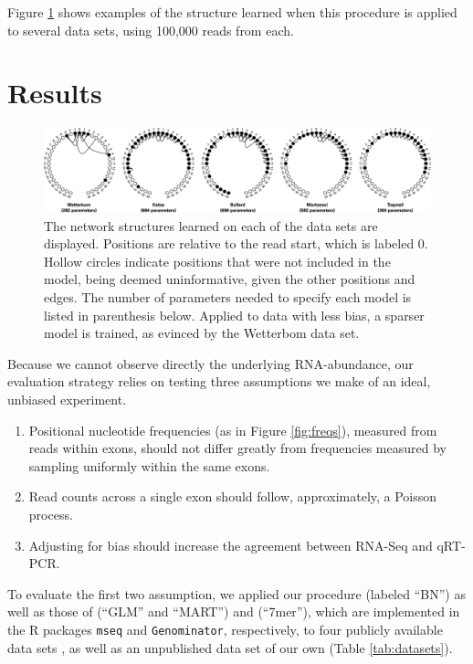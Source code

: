\documentclass{bioinfo}
\begin{document}
Figure \ref{fig:models} shows examples of the structure learned when this
procedure is applied to several data sets, using 100,000 reads from each.


\section{Results}

\begin{figure}
\centerline{\includegraphics[width=\textwidth]{models.eps}}
\caption{
The network structures learned on each of the data sets are displayed. Positions
are relative to the read start, which is labeled 0. Hollow circles indicate
positions that were not included in the model, being deemed uninformative, given
the other positions and edges. The number of parameters needed to
specify each model is listed in parenthesis below. Applied to data with less
bias, a sparser model is trained, as evinced by the Wetterbom data set.
}
\label{fig:models}
\end{figure}


Because we cannot observe directly the underlying RNA-abundance, our evaluation
strategy relies on testing three assumptions we make of an ideal, unbiased experiment.
\begin{enumerate}
\item Positional nucleotide frequencies (as in Figure \ref{fig:freqs}), measured
from reads within exons, should not differ greatly from frequencies measured by
sampling uniformly within the same exons.
\item Read counts across a single exon should follow, approximately, a Poisson
process.
\item Adjusting for bias should increase the agreement between RNA-Seq and
qRT-PCR.
\end{enumerate}

To evaluate the first two assumption, we applied our procedure (labeled ``BN'')
as well as those of \citet{Li2010} (``GLM'' and ``MART'') and \citet{Hansen2010}
(``7mer''), which are implemented in the R packages \texttt{mseq} and
\texttt{Genominator}, respectively, to four publicly available data sets
\citep{Bullard2010, Mortazavi2008, Trapnell2010, Wetterbom2010}, as well as an
unpublished data set of our own (Table \ref{tab:datasets}).
\end{document}

